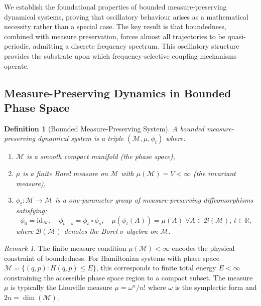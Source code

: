 \documentclass[twocolumn,10pt,a4paper]{article}
\newtheorem{definition}[theorem]{Definition}
\theoremstyle{remark}
\newtheorem{remark}[theorem]{Remark}
\newcommand{\manifold}{\mathcal{M}}
\newcommand{\Reals}{\mathbb{R}}
\begin{document}
We establish the foundational properties of bounded measure-preserving dynamical systems, proving that oscillatory behaviour arises as a mathematical necessity rather than a special case. The key result is that boundedness, combined with measure preservation, forces almost all trajectories to be quasi-periodic, admitting a discrete frequency spectrum. This oscillatory structure provides the substrate upon which frequency-selective coupling mechanisms operate.

\subsection{Measure-Preserving Dynamics in Bounded Phase Space}

\begin{definition}[Bounded Measure-Preserving System]
\label{def:bounded_system}
A \emph{bounded measure-preserving dynamical system} is a triple $(\manifold, \mu, \phi_t)$ where:
\begin{enumerate}[label=(\roman*), noitemsep]
    \item $\manifold$ is a smooth compact manifold (the phase space),
    \item $\mu$ is a finite Borel measure on $\manifold$ with $\mu(\manifold) = V < \infty$ (the invariant measure),
    \item $\phi_t: \manifold \to \manifold$ is a one-parameter group of measure-preserving diffeomorphisms satisfying:
    \begin{equation}
    \phi_0 = \text{id}_\manifold, \quad \phi_{t+s} = \phi_t \circ \phi_s, \quad \mu(\phi_t(A)) = \mu(A) \; \forall A \in \mathcal{B}(\manifold), \, t \in \Reals,
    \end{equation}
    where $\mathcal{B}(\manifold)$ denotes the Borel $\sigma$-algebra on $\manifold$.
\end{enumerate}
\end{definition}

\begin{remark}
The finite measure condition $\mu(\manifold) < \infty$ encodes the physical constraint of boundedness. For Hamiltonian systems with phase space $\manifold = \{(q,p) : H(q,p) \leq E\}$, this corresponds to finite total energy $E < \infty$ constraining the accessible phase space region to a compact subset. The measure $\mu$ is typically the Liouville measure $\mu = \omega^n / n!$ where $\omega$ is the symplectic form and $2n = \dim(\manifold)$.
\end{remark}
\end{document}
